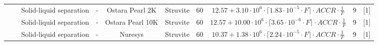 \documentclass[authoryear]{elsarticle}
\begin{document}
\begin{sidewaystable}[!htbp]
{\begin{threeparttable}
\begin{tabular}{@{}cccccccccc@{}}
				& & Solid-liquid separation
				&     -
				& Ostara Pearl 2K                                                                             & Struvite                                                                          & 60                                                                                    & $12.57 + 3.10 \cdot 10^6 \cdot \lceil 1.83 \cdot 10^{-5} \cdot F \rceil \cdot ACCR \cdot \frac{1}{F}$                                 & 9                                                            &  [1]        \\
				& & Solid-liquid separation
				&      -
				& Ostara Pearl 10K                                                                             & Struvite                                                                          & 60                                                                                    &  $12.57 + 10.00 \cdot 10^6 \cdot \lceil 3.65 \cdot 10^{-6} \cdot F \rceil \cdot ACCR \cdot \frac{1}{F}$                                  & 9                                                            &   [1]       \\
				&                                                                                                                                                         & Solid-liquid separation
				&              -
				& Nuresys                                                                                  & Struvite                                                                          & 60                                                                                    & $10.37 + 1.38 \cdot 10^6 \cdot \lceil 2.24 \cdot 10^{-5} \cdot F \rceil \cdot ACCR \cdot \frac{1}{F}$                                  & 9                                                            & [1]         \\

\end{tabular}
\end{threeparttable}}
\end{sidewaystable}
\end{document}
